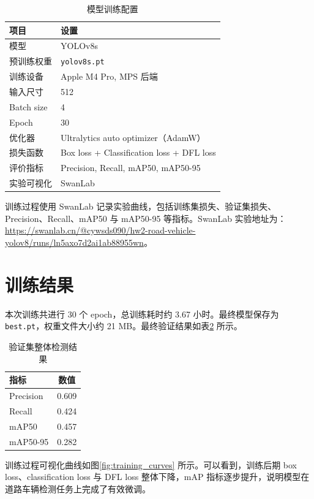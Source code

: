 \documentclass[UTF8,a4paper,12pt]{ctexart}
\begin{document}
\begin{table}[H]
\centering
\begin{tabular}{ll}
\toprule
项目 & 设置 \\
\midrule
模型 & YOLOv8s \\
预训练权重 & \texttt{yolov8s.pt} \\
训练设备 & Apple M4 Pro, MPS 后端 \\
输入尺寸 & 512 \\
Batch size & 4 \\
Epoch & 30 \\
优化器 & Ultralytics auto optimizer（AdamW） \\
损失函数 & Box loss + Classification loss + DFL loss \\
评价指标 & Precision, Recall, mAP50, mAP50-95 \\
实验可视化 & SwanLab \\
\bottomrule
\end{tabular}
\caption{模型训练配置}
\label{tab:train_config}
\end{table}

训练过程使用 SwanLab 记录实验曲线，包括训练集损失、验证集损失、Precision、Recall、mAP50 与 mAP50-95 等指标。SwanLab 实验地址为：
\url{https://swanlab.cn/@cywsds090/hw2-road-vehicle-yolov8/runs/ln5axo7d2ai1ab88955wn}。

\section{训练结果}

本次训练共进行 30 个 epoch，总训练耗时约 3.67 小时。最终模型保存为 \texttt{best.pt}，权重文件大小约 21 MB。最终验证结果如表\ref{tab:metrics} 所示。

\begin{table}[H]
\centering
\begin{tabular}{lc}
\toprule
指标 & 数值 \\
\midrule
Precision & 0.609 \\
Recall & 0.424 \\
mAP50 & 0.457 \\
mAP50-95 & 0.282 \\
\bottomrule
\end{tabular}
\caption{验证集整体检测结果}
\label{tab:metrics}
\end{table}

训练过程可视化曲线如图\ref{fig:training_curves} 所示。可以看到，训练后期 box loss、classification loss 与 DFL loss 整体下降，mAP 指标逐步提升，说明模型在道路车辆检测任务上完成了有效微调。
\end{document}
